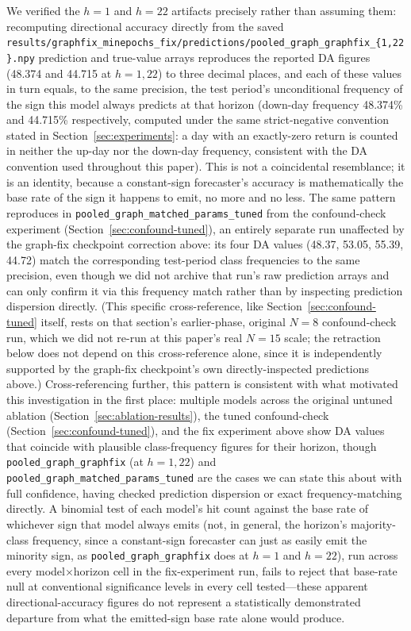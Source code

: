 \documentclass[journal]{IEEEtran}
\begin{document}
We verified the $h=1$ and $h=22$ artifacts precisely rather than assuming them: recomputing directional accuracy directly from the saved \texttt{results/graphfix\_minepochs\_fix/predictions/pooled\_graph\_graphfix\_\{1,22\}.npy} prediction and true-value arrays reproduces the reported DA figures (48.374 and 44.715 at $h=1,22$) to three decimal places, and each of these values in turn equals, to the same precision, the test period's unconditional frequency of the sign this model always predicts at that horizon (down-day frequency 48.374\% and 44.715\% respectively, computed under the same strict-negative convention stated in Section~\ref{sec:experiments}: a day with an exactly-zero return is counted in neither the up-day nor the down-day frequency, consistent with the DA convention used throughout this paper). This is not a coincidental resemblance; it is an identity, because a constant-sign forecaster's accuracy is mathematically the base rate of the sign it happens to emit, no more and no less. The same pattern reproduces in \texttt{pooled\_graph\_matched\_params\_tuned} from the confound-check experiment (Section~\ref{sec:confound-tuned}), an entirely separate run unaffected by the graph-fix checkpoint correction above: its four DA values (48.37, 53.05, 55.39, 44.72) match the corresponding test-period class frequencies to the same precision, even though we did not archive that run's raw prediction arrays and can only confirm it via this frequency match rather than by inspecting prediction dispersion directly. (This specific cross-reference, like Section~\ref{sec:confound-tuned} itself, rests on that section's earlier-phase, original $N=8$ confound-check run, which we did not re-run at this paper's real $N=15$ scale; the retraction below does not depend on this cross-reference alone, since it is independently supported by the graph-fix checkpoint's own directly-inspected predictions above.) Cross-referencing further, this pattern is consistent with what motivated this investigation in the first place: multiple models across the original untuned ablation (Section~\ref{sec:ablation-results}), the tuned confound-check (Section~\ref{sec:confound-tuned}), and the fix experiment above show DA values that coincide with plausible class-frequency figures for their horizon, though \texttt{pooled\_graph\_graphfix} (at $h=1,22$) and \texttt{pooled\_graph\_matched\_params\_tuned} are the cases we can state this about with full confidence, having checked prediction dispersion or exact frequency-matching directly. A binomial test of each model's hit count against the base rate of whichever sign that model always emits (not, in general, the horizon's majority-class frequency, since a constant-sign forecaster can just as easily emit the minority sign, as \texttt{pooled\_graph\_graphfix} does at $h=1$ and $h=22$), run across every model$\times$horizon cell in the fix-experiment run, fails to reject that base-rate null at conventional significance levels in every cell tested---these apparent directional-accuracy figures do not represent a statistically demonstrated departure from what the emitted-sign base rate alone would produce.
\end{document}

